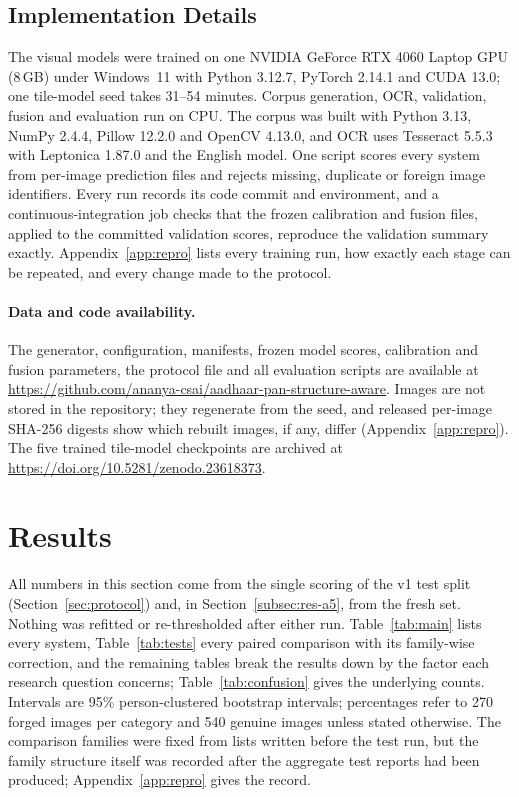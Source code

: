 \documentclass[conference]{IEEEtran}
\begin{document}
\subsection{Implementation Details}
\label{subsec:implementation}

The visual models were trained on one NVIDIA GeForce RTX 4060 Laptop GPU
(8\,GB) under Windows~11 with Python 3.12.7, PyTorch 2.14.1 and
CUDA 13.0; one tile-model seed takes 31--54 minutes. Corpus
generation, OCR, validation, fusion and evaluation run on CPU. The
corpus was built with Python 3.13, NumPy 2.4.4, Pillow 12.2.0 and
OpenCV 4.13.0, and OCR uses Tesseract 5.5.3 with Leptonica 1.87.0 and
the English model. One script scores every system from per-image
prediction files and rejects missing, duplicate or foreign image
identifiers. Every run records its code commit and environment, and a
continuous-integration job checks that the frozen calibration and
fusion files, applied to the committed validation scores, reproduce the
validation summary exactly. Appendix~\ref{app:repro} lists every
training run, how exactly each stage can be repeated, and every change
made to the protocol.

\paragraph*{Data and code availability.} The generator, configuration,
manifests, frozen model scores, calibration and fusion parameters, the
protocol file and all evaluation scripts are available at
\url{https://github.com/ananya-csai/aadhaar-pan-structure-aware}.
Images are not stored in the repository; they regenerate from the seed,
and released per-image SHA-256 digests show which rebuilt images, if
any, differ (Appendix~\ref{app:repro}). The five trained tile-model checkpoints
are archived at \url{https://doi.org/10.5281/zenodo.23618373}.

\section{Results}
\label{sec:results}

All numbers in this section come from the single scoring of the v1 test
split (Section~\ref{sec:protocol}) and, in
Section~\ref{subsec:res-a5}, from the fresh set. Nothing was refitted or
re-thresholded after either run. Table~\ref{tab:main} lists every
system, Table~\ref{tab:tests} every paired comparison with its
family-wise correction, and the remaining tables break the results down
by the factor each research question concerns; Table~\ref{tab:confusion}
gives the underlying counts. Intervals are 95\%
person-clustered bootstrap intervals; percentages refer to 270 forged
images per category and 540 genuine images unless stated otherwise.
The comparison families were fixed from lists written before the test
run, but the family structure itself was recorded after the aggregate
test reports had been produced; Appendix~\ref{app:repro} gives the
record.
\end{document}
